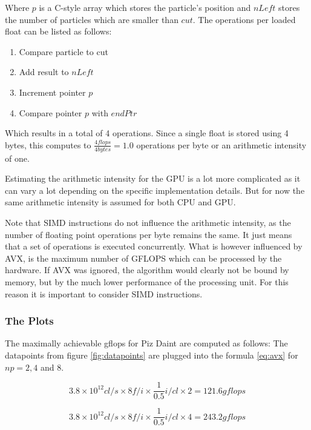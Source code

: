 \documentclass[]{article}
\begin{document}
Where $p$ is a C-style array which stores the particle's position and $nLeft$ stores the number of particles which are smaller than $cut$. The operations per loaded float can be listed as follows:

\begin{enumerate}
	\item Compare particle to cut
	\item Add result to $nLeft$
	\item Increment pointer $p$
	\item Compare pointer $p$ with $endPtr$
\end{enumerate}

Which results in a total of 4 operations. Since a single float is stored using 4 bytes, this computes to $\frac{4 flops}{4 bytes} = 1.0$ operations per byte or an arithmetic intensity of one. 

Estimating the arithmetic intensity for the GPU is a lot more complicated as it can vary a lot depending on the specific implementation details. But for now the same arithmetic intensity is assumed for both CPU and GPU. 

Note that SIMD instructions do not influence the arithmetic intensity, as the number of floating point operations per byte remains the same. It just means that a set of operations is executed concurrently. What is however influenced by AVX, is the maximum number of GFLOPS which can be processed by the hardware. If AVX was ignored, the algorithm would clearly not be bound by memory, but by the much lower performance of the processing unit. For this reason it is important to consider SIMD instructions.

\subsubsection{The Plots}

The maximally achievable gflops for Piz Daint are computed as follows: The datapoints from figure \ref{fig:datapoints} are plugged into the formula \ref{eq:avx} for $np = 2, 4$ and $8$.

\begin{center}
	\begin{equation}
		3.8 \times 10^{12} cl/s \times 8 f/i \times \frac{1}{0.5} i/cl \times 2  = 121.6 gflops
	\end{equation}
	\label{eq:daintp1}
\end{center}

\begin{center}
	\begin{equation}
		3.8 \times 10^{12} cl/s \times 8 f/i \times \frac{1}{0.5} i/cl \times 4 = 243.2 gflops
	\end{equation}
	\label{eq:daintp2}
\end{center}
\end{document}
